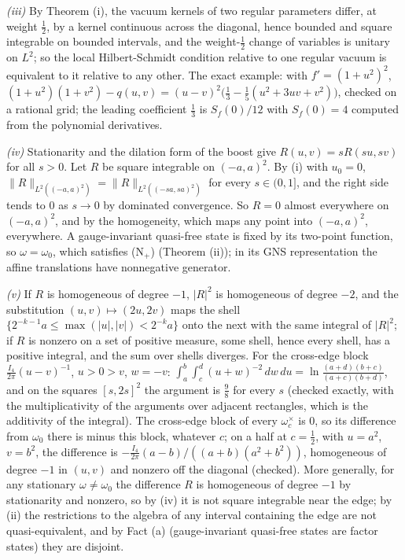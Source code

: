 \emph{(iii)} By Theorem (i), the vacuum kernels of two regular parameters differ, at weight $\tfrac12$, by a kernel continuous across the diagonal, hence bounded and square integrable on bounded intervals, and the weight-$\tfrac12$ change of variables is unitary on $L^{2}$; so the local Hilbert-Schmidt condition relative to one regular vacuum is equivalent to it relative to any other. The exact example: with $f' = (1 + u^{2})^{2}$, $(1 + u^{2})(1 + v^{2}) - q(u, v) = (u - v)^{2}\big(\tfrac13 - \tfrac15(u^{2} + 3uv + v^{2})\big)$, checked on a rational grid; the leading coefficient $\tfrac13$ is $S_{f}(0)/12$ with $S_{f}(0) = 4$ computed from the polynomial derivatives.

\emph{(iv)} Stationarity and the dilation form of the boost give $R(u, v) = sR(su, sv)$ for all $s > 0$. Let $R$ be square integrable on $(-a, a)^{2}$. By (i) with $u_{0} = 0$, $\|R\|_{L^{2}((-a, a)^{2})} = \|R\|_{L^{2}((-sa, sa)^{2})}$ for every $s \in (0, 1]$, and the right side tends to $0$ as $s \to 0$ by dominated convergence. So $R = 0$ almost everywhere on $(-a, a)^{2}$, and by the homogeneity, which maps any point into $(-a, a)^{2}$, everywhere. A gauge-invariant quasi-free state is fixed by its two-point function, so $\omega = \omega_{0}$, which satisfies (N$_{+}$) (Theorem (ii)); in its GNS representation the affine translations have nonnegative generator.

\emph{(v)} If $R$ is homogeneous of degree $-1$, $|R|^{2}$ is homogeneous of degree $-2$, and the substitution $(u, v) \mapsto (2u, 2v)$ maps the shell $\{2^{-k-1}a \le \max(|u|, |v|) < 2^{-k}a\}$ onto the next with the same integral of $|R|^{2}$; if $R$ is nonzero on a set of positive measure, some shell, hence every shell, has a positive integral, and the sum over shells diverges. For the cross-edge block $\tfrac{I_{4}}{2\pi}(u - v)^{-1}$, $u > 0 > v$, $w = -v$: $\int_{a}^{b}\int_{c}^{d}(u + w)^{-2}\,dw\,du = \ln\frac{(a + d)(b + c)}{(a + c)(b + d)}$, and on the squares $[s, 2s]^{2}$ the argument is $\tfrac98$ for every $s$ (checked exactly, with the multiplicativity of the arguments over adjacent rectangles, which is the additivity of the integral). The cross-edge block of every $\omega_{c}^{\times}$ is $0$, so its difference from $\omega_{0}$ there is minus this block, whatever $c$; on a half at $c = \tfrac12$, with $u = a^{2}$, $v = b^{2}$, the difference is $-\tfrac{I_{4}}{2\pi}(a - b)/((a + b)(a^{2} + b^{2}))$, homogeneous of degree $-1$ in $(u, v)$ and nonzero off the diagonal (checked). More generally, for any stationary $\omega \neq \omega_{0}$ the difference $R$ is homogeneous of degree $-1$ by stationarity and nonzero, so by (iv) it is not square integrable near the edge; by (ii) the restrictions to the algebra of any interval containing the edge are not quasi-equivalent, and by Fact (a) (gauge-invariant quasi-free states are factor states) they are disjoint.

